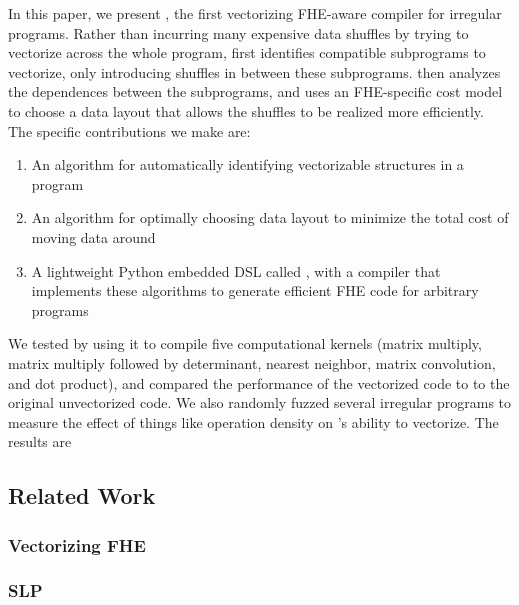 In this paper, we present \system, the first vectorizing FHE-aware compiler for irregular programs.
Rather than incurring many expensive data shuffles by trying to vectorize across the whole program, \system first identifies compatible subprograms to vectorize, only introducing shuffles in between these subprograms.
\system then analyzes the dependences between the subprograms, and uses an FHE-specific cost model to choose a data layout that allows the shuffles to be realized more efficiently.
The specific contributions we make are:
\begin{enumerate}
    \item An algorithm for automatically identifying vectorizable structures in a program
    \item An algorithm for optimally choosing data layout to minimize the total cost of moving data around
    \item A lightweight Python embedded DSL called \system, with a compiler that implements these algorithms to generate efficient FHE code for arbitrary programs 
\end{enumerate}

We tested \system by using it to compile five computational kernels (matrix multiply, matrix multiply followed by determinant, nearest neighbor, matrix convolution, and dot product), and compared the performance of the vectorized code to to the original unvectorized code.
We also randomly fuzzed several irregular programs to measure the effect of things like operation density on \system's ability to vectorize. 
The results are 
\subsection{Related Work} %
\subsubsection{Vectorizing FHE} 
\subsubsection{SLP} 